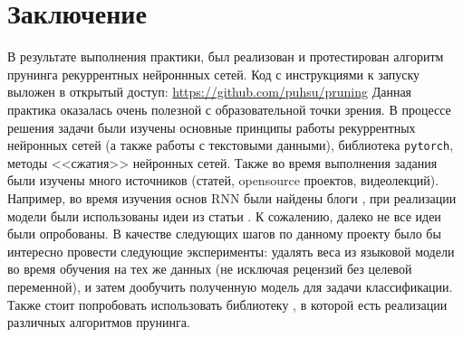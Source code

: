 \documentclass[12pt]{article}
\begin{document}
\section*{Заключение}
%
В результате выполнения практики, был реализован и протестирован алгоритм прунинга рекуррентных нейроннных сетей. 
Код с инструкциями к запуску выложен в открытый доступ: \url{https://github.com/puhsu/pruning}
Данная практика оказалась очень полезной с образовательной точки зрения. В процессе 
решения задачи были изучены основные принципы работы рекуррентных нейронных сетей (а также 
работы с текстовыми данными), библиотека \texttt{pytorch}, методы 
<<сжатия>> нейронных сетей. Также во время выполнения задания были изучены много источников 
(статей, opensource проектов, видеолекций). Например, во время изучения основ RNN были найдены 
блоги \cite{colah, karpathy}, при реализации модели были использованы
идеи из статьи \cite{DBLP:journals/corr/abs-1801-06146}. К сожалению, далеко 
не все идеи были опробованы. В качестве следующих шагов по данному проекту было бы интересно
провести следующие эксперименты: удалять веса из языковой модели во время 
обучения на тех же данных (не исключая рецензий без целевой переменной), и затем дообучить полученную
модель для задачи классификации. Также стоит попробовать использовать библиотеку \cite{neta_zmora_2018_1297430}, в которой 
есть реализации различных алгоритмов прунинга.

\newpage

\nocite{*}
\printbibliography[title={Список используемых источников}]
\end{document}
